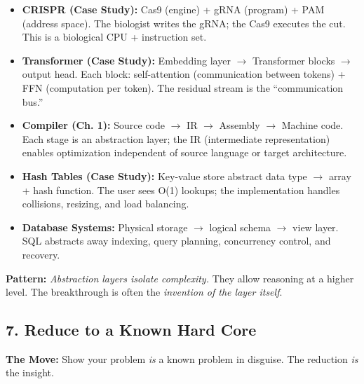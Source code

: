 \begin{itemize}
\item \textbf{CRISPR (Case Study):} Cas9 (engine) + gRNA (program) + PAM (address space). The biologist writes the gRNA; the Cas9 executes the cut. This is a biological CPU + instruction set.

\item \textbf{Transformer (Case Study):} Embedding layer $\to$ Transformer blocks $\to$ output head. Each block: self-attention (communication between tokens) + FFN (computation per token). The residual stream is the ``communication bus.''

\item \textbf{Compiler (Ch. 1):} Source code $\to$ IR $\to$ Assembly $\to$ Machine code. Each stage is an abstraction layer; the IR (intermediate representation) enables optimization independent of source language or target architecture.

\item \textbf{Hash Tables (Case Study):} Key-value store abstract data type $\to$ array + hash function. The user sees O(1) lookups; the implementation handles collisions, resizing, and load balancing.

\item \textbf{Database Systems:} Physical storage $\to$ logical schema $\to$ view layer. SQL abstracts away indexing, query planning, concurrency control, and recovery.
\end{itemize}

\begin{mentalLeap}\textbf{Pattern:} \emph{Abstraction layers isolate complexity.} They allow reasoning at a higher level. The breakthrough is often the \emph{invention of the layer itself}.\end{mentalLeap}
\subsection{7. Reduce to a Known Hard Core}
\label{sec:anatomy:reduction}

\textbf{The Move:} Show your problem \emph{is} a known problem in disguise. The reduction \emph{is} the insight.

